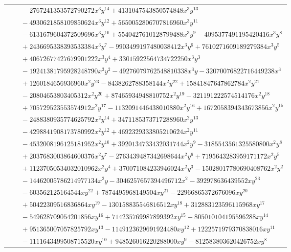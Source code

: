 \documentclass[11pt]{article}
\begin{document}
\begin{longtable}{@{}ll@{}}
 & $\quad -2767241353572790272x^{3}y^{14}+4131047543850574848x^{3}y^{13}$\\
 & $\quad -4930621858109850624x^{3}y^{12}+5650052806707816960x^{3}y^{11}$\\
 & $\quad -6131679604372509696x^{3}y^{10}+5540427610128799488x^{3}y^{9}-4095377491195420416x^{3}y^{8}$\\
 & $\quad +2436695338393533384x^{3}y^{7}-9903499197480038412x^{3}y^{6}+7610271609189279384x^{3}y^{5}$\\
 & $\quad +40672677427679901222x^{3}y^{4}+33015922564734722250x^{3}y^{3}$\\
 & $\quad -19241381795928248790x^{3}y^{2}-49276079762548810338x^{3}y-32070076822716449238x^{3}$\\
 & $\quad +1260184656936960x^{2}y^{23}-8438262788358144x^{2}y^{22}+15841847647862784x^{2}y^{21}$\\
 & $\quad -20804653803405312x^{2}y^{20}+87465934948810752x^{2}y^{19}-321191222574514176x^{2}y^{18}$\\
 & $\quad +705729523553574912x^{2}y^{17}-1132091446438010880x^{2}y^{16}+1672058394343673856x^{2}y^{15}$\\
 & $\quad -2488380935774625792x^{2}y^{14}+3471185373717288960x^{2}y^{13}$\\
 & $\quad -4298841908173780992x^{2}y^{12}+4692329333805210624x^{2}y^{11}$\\
 & $\quad -4532008196125181952x^{2}y^{10}+3920134733432031744x^{2}y^{9}-3185543561325580800x^{2}y^{8}$\\
 & $\quad +2037683003864600376x^{2}y^{7}-2763439487342698644x^{2}y^{6}+7195643283959171172x^{2}y^{5}$\\
 & $\quad +11237050534032010962x^{2}y^{4}+370071084233946024x^{2}y^{3}-15028017780690408762x^{2}y^{2}$\\
 & $\quad -14462005786214977134x^{2}y-3046257657394496712x^{2}-392978636439552xy^{23}$\\
 & $\quad -603562125164544xy^{22}+7874495968149504xy^{21}-22966865372676096xy^{20}$\\
 & $\quad +50422309516836864xy^{19}-130158835546816512xy^{18}+312883123596115968xy^{17}$\\
 & $\quad -549628709054201856xy^{16}+714235769987899392xy^{15}-805010104195596288xy^{14}$\\
 & $\quad +951365007057825792xy^{13}-1149123629691924480xy^{12}+1222571979370838016xy^{11}$\\
 & $\quad -1111643499508715520xy^{10}+948526016220288000xy^{9}-812583803620426752xy^{8}$\\

\end{longtable}
\end{document}
